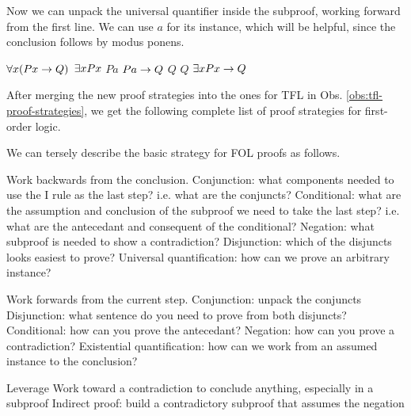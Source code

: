 Now we can unpack the universal quantifier inside the subproof, working forward
from the first line. We can use $a$ for its instance, which will be helpful,
since the conclusion follows by modus ponens.

\begin{fitchproof}
   {$\forall x(Px\rightarrow Q)$} 
  \open
   {$\exists x Px$}          
  \open
   {$Pa$}                     
   {$Pa\rightarrow Q$}               
   {$Q$}                      
  \close
   {$Q$}                     
  \close
   {$\exists x Px\rightarrow Q$} 
\end{fitchproof}

After merging the new proof strategies into the ones for TFL in Obs.
\ref{obs:tfl-proof-strategies}, we get the following complete list of proof
strategies for first-order logic.

\begin{observation}
  \label{obs:fol-proof-strategies}
  We can tersely describe the basic strategy for FOL proofs as follows.
  \begin{outline}[enumerate]

    \1 Work backwards from the conclusion.
    \2 Conjunction: what components needed to use the \eand I rule as the
    last step? i.e. what are the conjuncts?
    \2 Conditional: what are the assumption and conclusion of the subproof
    we need to take the last step? i.e. what are the antecedant and consequent
    of the conditional?
    \2 Negation: what subproof is needed to show a contradiction?
    \2 Disjunction: which of the disjuncts looks easiest to prove?
    \2 Universal quantification: how can we prove an arbitrary instance?
    
    \1 Work forwards from the current step.
    \2 Conjunction: unpack the conjuncts
    \2 Disjunction: what sentence do you need to prove from both disjuncts?
    \2 Conditional: how can you prove the antecedant?
    \2 Negation: how can you prove a contradiction?
    \2 Existential quantification: how can we work from an assumed instance to
    the conclusion?
    
    \1 Leverage \ebot
    \2 Work toward a contradiction to conclude anything, especially in a
    subproof
    \2 Indirect proof: build a contradictory subproof that assumes the negation

  \end{outline}
\end{observation}

